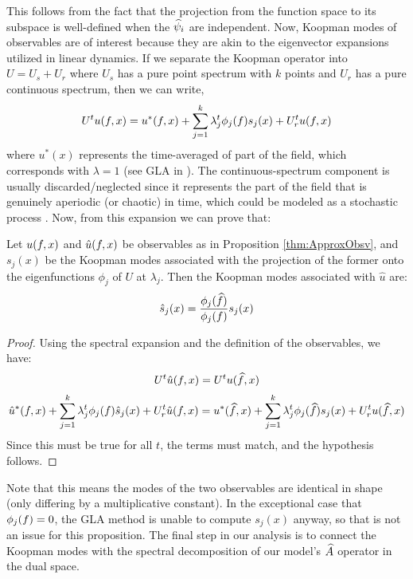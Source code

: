 This follows from the fact that the projection from the function space to its subspace is well-defined when the $\widehat{\psi}_i$ are independent. Now, Koopman modes of observables are of interest because they are akin to the eigenvector expansions utilized in linear dynamics. If we separate the Koopman operator into $U = U_s + U_r$ where $U_s$ has a pure point spectrum with $k$ points and $U_r$ has a pure continuous spectrum, then we can write,
\begin{align} \eqlabel{spectral_expansion}
U^t u(\fspaceEl,x) = u^{\ast}(\fspaceEl,x) + \sum_{j=1}^k \lambda_j^t \phi_j(\fspaceEl) s_j (x)  +  U_r^t u(\fspaceEl,x)
\end{align}
where $u^{\ast}(x)$ represents the time-averaged of part of the field, which corresponds with $\lambda=1$ (see GLA in \cite{mezic2013analysis}). The continuous-spectrum component is usually discarded/neglected since it represents the part of the field that is genuinely aperiodic (or chaotic) in time, which could be modeled as a stochastic process \cite{mezic2013analysis}. Now, from this expansion we can prove that:

\begin{proposition}\label{prop:ApproxModes}
	Let $u(f,x)$ and $\hat u(f,x)$ be observables as in Proposition \ref{thm:ApproxObsv}, and $s_j(x)$ be the Koopman modes associated with the projection of the former onto the eigenfunctions $\phi_j$ of $U$ at $\lambda_j$. Then the Koopman modes associated with $\hat u$ are:
	\begin{align}
	\hat s_j(x) = \frac{\phi_j(\widehat{f})}{\phi_j(f)} s_j(x)
	\end{align}
\end{proposition}
\begin{proof}
	Using the spectral expansion and the definition of the observables, we have:
	$$U^t \hat u(f,x) = U^t u(\widehat{f},x) $$
	$$ \hat u^{\ast}(f,x) + \sum_{j=1}^k \lambda_j^t \phi_j(f) \hat s_j (x)  +  U_r^t \hat u(f,x) = u^{\ast}(\widehat{f},x) + \sum_{j=1}^k \lambda_j^t \phi_j(\widehat{f}) s_j (x)  +  U_r^t u(\widehat{f},x)$$
	Since this must be true for all $t$, the terms must match, and the hypothesis follows.%
\end{proof}


Note that this means the modes of the two observables are identical in shape (only differing by a multiplicative constant). In the exceptional case that $\phi_j(f)=0$, the GLA method is unable to compute $s_j (x)$ anyway, so that is not an issue for this proposition. The final step in our analysis is to connect the Koopman modes with the spectral decomposition of  our model's $\widehat{A}$ operator in the dual space.

